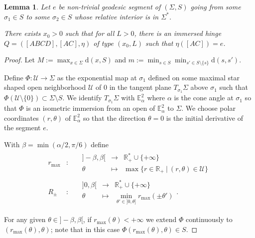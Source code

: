 \documentclass[a4paper,12pt]{article}
\def\U{\mathcal U}
\def\R{\mathbb{R}}
\def\E{\mathbf E}
\def\d{\mathrm{d}}
\def\E{\mathbb{E}}
\def\RR{\mathbb{R}}
\def\R{\mathcal R}
\def\E{\mathbb{E}}
\def\d{\mathrm{d}}
\def\U{\mathcal{U}}
\newcommand{\functionn}[4]{\displaystyle\begin{array}{l|rcl}
& \displaystyle #1 & \longrightarrow & \displaystyle #2 \\
	& \displaystyle #3 & \longmapsto & \displaystyle #4 \end{array}}
\newtheorem{lem}{Lemma}[section]		 %
\theoremstyle{definition}
\begin{document}
				\begin{lem}\label{lem:charniere_type_existence}
				 	Let $e$ be non-trivial geodesic segment of $(\Sigma, S)$ going from some $\sigma_1 \in S$ to some $\sigma_2\in S$ whose relative interior is in $\Sigma^*$.

				 	There exists $x_0>0$ such that for all $L>0$, there is an immersed hinge
				 	$Q=([ABCD],[AC],\eta)$ of type 
				 	$(x_0,L)$ such that $\eta([AC])=e$.
				\end{lem}
				\begin{proof}
				 Let $M:= \max_{x\in \Sigma} \d(x, S)$ and $m:=\min_{s\in S} \min _{s'\in S\setminus\{s\}}\d(s,s')$.
				 
				 Define $\Phi: \U\rightarrow \Sigma$ as the exponential map at $\sigma_1$ defined on some maximal star shaped open neighborhood $\U$ of $0$ in the tangent plane $T_{\sigma_1}\Sigma$ above $\sigma_1$ such that $\Phi(\U\setminus \{0\})\subset \Sigma\setminus S$. We identify $T_{\sigma_1}\Sigma$ with $\E^2_\alpha$ where $\alpha$ is the cone angle at $\sigma_1$ so that $\Phi$ is an isometric immersion from an open of $\E^2_\alpha$ to $\Sigma$. We choose polar coordinates $(r,\theta)$ of $\E^2_\alpha$ so that the direction $\theta=0$ is the initial derivative of the segment $e$. 
				 
				 With $\beta=\min(\alpha/2,\pi/6)$ define \begin{eqnarray*}r_{\max}&:&
				 \functionn{]-\beta,\beta[}{\RR_+^*\cup\{+\infty\}}{\theta}{ \max \{r \in \RR_ + ~|~ (r,\theta) \in \U \}}
				 \\R_{\pm}&:& \functionn{]0,\beta[}{\RR_+^*\cup\{+\infty\}}{\theta}{\min_{\theta'\in ]0,\theta]} r_{\max}(\pm\theta')}. 
				 \end{eqnarray*}

				 For any given $\theta \in ]-\beta,\beta[$, if $r_{\max}(\theta)<+\infty$ we extend $\Phi$ continuously to $(r_{\max}(\theta),\theta)$; note that in this case $\Phi(r_{\max}(\theta),\theta)\in S$.
				 

\end{proof}
\end{document}
